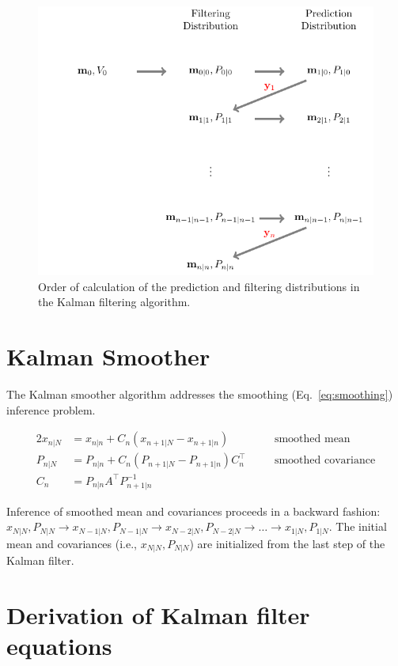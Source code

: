 \documentclass[12pt]{article}
\begin{document}
\begin{figure}[h]
\begin{center}
    \includegraphics[width=5in]{figures/kfAlternations.pdf}
    \caption{Order of calculation of the prediction and filtering distributions
    in the Kalman filtering algorithm.}
    \label{fig:kfAlternations.}
\end{center}
\end{figure}

\section{Kalman Smoother}

The Kalman smoother algorithm addresses the smoothing (Eq.~\ref{eq:smoothing})
inference problem.

\begin{alignat*}{2}
    x_{n|N}&=x_{n|n}+C_n(x_{n+1|N}-x_{n+1|n})\quad&&\text{smoothed mean}\\
    P_{n|N}&=P_{n|n}+C_n(P_{n+1|N}-P_{n+1|n})C_n^\intercal\quad&&\text{smoothed covariance}\\
    C_n&=P_{n|n}A^\intercal P_{n+1|n}^{-1}&&
\end{alignat*}

Inference of smoothed mean and covariances proceeds in a backward fashion:
$x_{N|N}, P_{N|N}\rightarrow x_{N-1|N}, P_{N-1|N}\rightarrow x_{N-2|N},
P_{N-2|N}\rightarrow\ldots\rightarrow  x_{1|N}, P_{1|N}$. The initial mean and
covariances (i.e., $x_{N|N}, P_{N|N}$) are initialized from the last step of
the Kalman filter.

\section{Derivation of Kalman filter equations}
\end{document}
